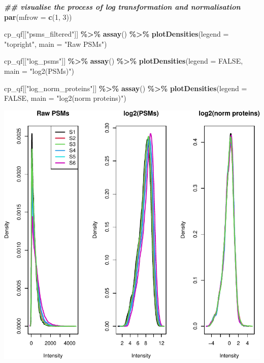 \documentclass[9pt,a4paper,]{extarticle}
\newenvironment{Shaded}{\begin{snugshade}}{\end{snugshade}}
\newcommand{\AttributeTok}[1]{\textcolor[rgb]{0.13,0.29,0.53}{#1}}
\newcommand{\ConstantTok}[1]{\textcolor[rgb]{0.56,0.35,0.01}{#1}}
\newcommand{\DecValTok}[1]{\textcolor[rgb]{0.00,0.00,0.81}{#1}}
\newcommand{\DocumentationTok}[1]{\textcolor[rgb]{0.56,0.35,0.01}{\textbf{\textit{#1}}}}
\newcommand{\FunctionTok}[1]{\textcolor[rgb]{0.13,0.29,0.53}{\textbf{#1}}}
\newcommand{\NormalTok}[1]{#1}
\newcommand{\SpecialCharTok}[1]{\textcolor[rgb]{0.81,0.36,0.00}{\textbf{#1}}}
\newcommand{\StringTok}[1]{\textcolor[rgb]{0.31,0.60,0.02}{#1}}
\begin{document}
\begin{Shaded}
\begin{Highlighting}[]
\DocumentationTok{\#\# visualise the process of log transformation and normalisation}
\FunctionTok{par}\NormalTok{(}\AttributeTok{mfrow =} \FunctionTok{c}\NormalTok{(}\DecValTok{1}\NormalTok{, }\DecValTok{3}\NormalTok{))}

\NormalTok{cp\_qf[[}\StringTok{"psms\_filtered"}\NormalTok{]] }\SpecialCharTok{\%\textgreater{}\%}
  \FunctionTok{assay}\NormalTok{() }\SpecialCharTok{\%\textgreater{}\%}
  \FunctionTok{plotDensities}\NormalTok{(}\AttributeTok{legend =} \StringTok{"topright"}\NormalTok{,}
                \AttributeTok{main =} \StringTok{"Raw PSMs"}\NormalTok{)}

\NormalTok{cp\_qf[[}\StringTok{"log\_psms"}\NormalTok{]] }\SpecialCharTok{\%\textgreater{}\%}
  \FunctionTok{assay}\NormalTok{() }\SpecialCharTok{\%\textgreater{}\%}
  \FunctionTok{plotDensities}\NormalTok{(}\AttributeTok{legend =} \ConstantTok{FALSE}\NormalTok{,}
                \AttributeTok{main =} \StringTok{"log2(PSMs)"}\NormalTok{)}

\NormalTok{cp\_qf[[}\StringTok{"log\_norm\_proteins"}\NormalTok{]] }\SpecialCharTok{\%\textgreater{}\%}
  \FunctionTok{assay}\NormalTok{() }\SpecialCharTok{\%\textgreater{}\%}
  \FunctionTok{plotDensities}\NormalTok{(}\AttributeTok{legend =} \ConstantTok{FALSE}\NormalTok{,}
                \AttributeTok{main =} \StringTok{"log2(norm proteins)"}\NormalTok{)}
\end{Highlighting}
\end{Shaded}

\begin{center}\includegraphics[width=0.9\linewidth]{workflow_expressions_files/figure-latex/tmt_transformations-1} \end{center}
\end{document}
